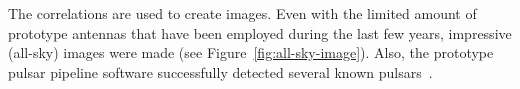 \documentclass{sig-alternate}
\begin{document}
The correlations are used to create images.
Even with the limited amount of prototype antennas that have been employed
during the last few years, impressive (all-sky) images were made (see
Figure~\ref{fig:all-sky-image}).
Also, the prototype pulsar pipeline software successfully detected several
known pulsars~\cite{Hessels:09}.







\end{document}
